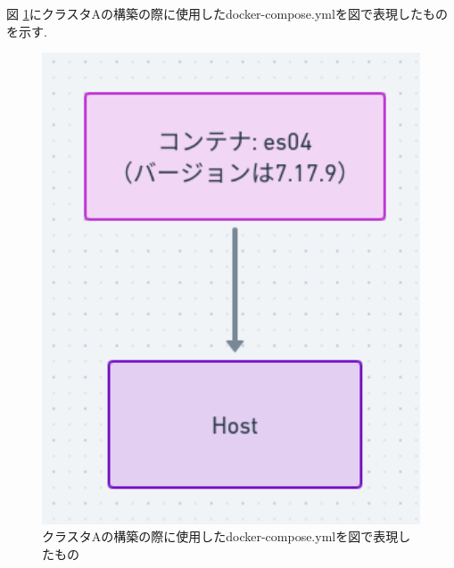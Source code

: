 図 \ref{d3}にクラスタAの構築の際に使用したdocker-compose.ymlを図で表現したものを示す.

\begin{figure}[!ht]
  \begin{center}
    \includegraphics[width=160mm]{sotu/figure/1-7.17.9.png}
    \caption{クラスタAの構築の際に使用したdocker-compose.ymlを図で表現したもの}
    \label{d3}
  \end{center}
\end{figure}



